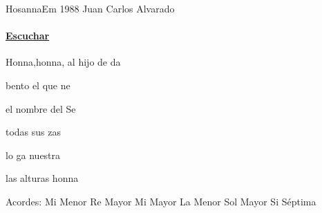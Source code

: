 \documentclass[12pt, spanish]{book}
\begin{document}
    \begin{song}{Hosanna}{Em}
    {1988} %
    {Juan Carlos Alvarado}
    {} %
    {}
        \ifChordBk
        \paragraph{\mbox{}\hfill\protect\href{https://open.spotify.com/intl-es/track/6zDbHnYakPeUQsCdAi59Ef}{Escuchar}\mbox{}\hfill}
        \fi

        \begin{SBOpGroup}
            Honna,honna, al hijo de da
        \end{SBOpGroup}

        \begin{SBChorus}
            bento el que ne

             el nombre del Se

             todas sus zas

            lo ga nuestra 
        \end{SBChorus}

        \begin{SBOpGroup}
             las alturas honna
        \end{SBOpGroup}

        \ifChordBk
        \begin{SBOpGroup}
            Acordes:\break
            \upchord{\Em}\qquad Mi Menor \hfill
            \upchord{\D}\qquad Re Mayor \hfill\null\break
            \upchord{\E}\qquad Mi Mayor \hfill
            \upchord{\Am}\qquad La Menor \hfill\null\break
            \upchord{\G}\qquad Sol Mayor \hfill
            \upchord{\Bseven}\qquad Si S\'eptima \hfill\null\break
        \end{SBOpGroup}
        \fi
    \end{song}
\end{document}
